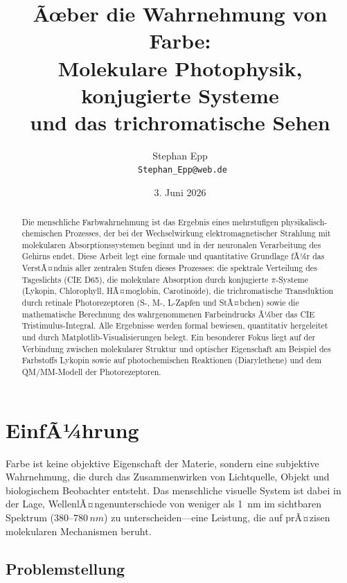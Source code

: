 ﻿\documentclass[a4paper,12pt]{article}
\title{\textbf{Ãœber die Wahrnehmung von Farbe:\\
Molekulare Photophysik, konjugierte Systeme\\
und das trichromatische Sehen}}
\author{Stephan Epp\\
\
\small \texttt{Stephan\_Epp@web.de}}
\date{3. Juni 2026}
\theoremstyle{definition}
\begin{document}
\maketitle

\begin{abstract}
Die menschliche Farbwahrnehmung ist das Ergebnis eines mehrstufigen physikalisch-chemischen Prozesses,
der bei der Wechselwirkung elektromagnetischer Strahlung mit molekularen Absorptionssystemen beginnt
und in der neuronalen Verarbeitung des Gehirns endet. Diese Arbeit legt eine formale und
quantitative Grundlage fÃ¼r das VerstÃ¤ndnis aller zentralen Stufen dieses Prozesses:
die spektrale Verteilung des Tageslichts (CIE D65), die molekulare Absorption durch
konjugierte $\pi$-Systeme (Lykopin, Chlorophyll, HÃ¤moglobin, Carotinoide),
die trichromatische Transduktion durch retinale Photorezeptoren (S-, M-, L-Zapfen und StÃ¤bchen)
sowie die mathematische Berechnung des wahrgenommenen Farbeindrucks Ã¼ber das
CIE Tristimulus-Integral. Alle Ergebnisse werden formal bewiesen, quantitativ hergeleitet
und durch Matplotlib-Visualisierungen belegt. Ein besonderer Fokus liegt auf der Verbindung
zwischen molekularer Struktur und optischer Eigenschaft am Beispiel des Farbstoffs Lykopin
sowie auf photochemischen Reaktionen (Diarylethene) und dem QM/MM-Modell der Photorezeptoren.
\end{abstract}

\tableofcontents
\newpage

\section{EinfÃ¼hrung}

Farbe ist keine objektive Eigenschaft der Materie, sondern eine subjektive Wahrnehmung,
die durch das Zusammenwirken von Lichtquelle, Objekt und biologischem Beobachter entsteht.
Das menschliche visuelle System ist dabei in der Lage, WellenlÃ¤ngenunterschiede von weniger
als \SI{1}{nm} im sichtbaren Spektrum ($380$--$780\,\si{nm}$) zu unterscheiden---eine Leistung,
die auf prÃ¤zisen molekularen Mechanismen beruht.

\subsection{Problemstellung}
\end{document}
